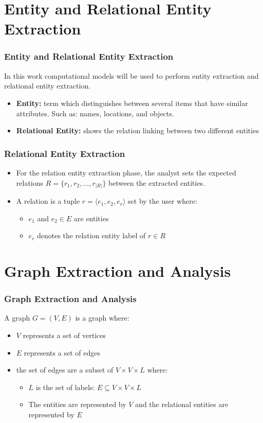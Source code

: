 \documentclass[xcolor=table]{beamer}
\begin{document}
\section{Entity and Relational Entity Extraction}
\begin{frame}
\frametitle{Entity and Relational Entity Extraction}


In this work computational models will be used to perform entity extraction and relational entity extraction.
\begin{itemize}
\item \textbf{Entity:} term which distinguishes between several items that have similar attributes. Such as: names, locations, and objects.

\item\textbf{Relational Entity:} shows the relation linking between two different entities
\end{itemize}

\end{frame}


\begin{frame}
\frametitle{Relational Entity Extraction}
\begin{itemize}
\item For the relation entity extraction phase, the analyst sets the expected relations $R=\{r_1,r_2,\ldots,r_{|R|}\}$ 
between the extracted entities.
\item A relation is a tuple $r=\langle e_1,e_2,e_r\rangle$ set by the user where: 
\begin{itemize}
    \item $e_1$ and $e_2\in E $ are entities 
    \item $e_r$ denotes the relation entity label of $r\in R$
\end{itemize}

\end{itemize}
\end{frame}

\section{Graph Extraction and Analysis}
\begin{frame}
\frametitle{Graph Extraction and Analysis}
A graph $G=(V,E)$ is a graph where:
\begin{itemize}
    \item $V$ represents a set of
vertices
    \item $E$ represents a set of edges
    \item the set of edges are a subset of $V\times V\times L$ where:
    \begin{itemize}
        \item $L$ is the set of labels: $E\subseteq V\times V\times L$
        \item  The entities are represented by $V$ and the relational entities are represented by $E$
    \end{itemize}
    
\end{itemize}  
\end{frame}
\end{document}
